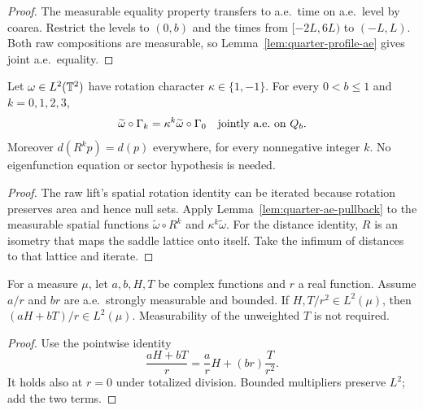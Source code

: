 \begin{proof}
\leanok
The measurable equality property transfers to a.e.\ time on a.e.\
level by coarea. Restrict the levels to $(0,b)$ and the times from
$[-2L,6L)$ to $(-L,L)$. Both raw compositions are measurable, so
Lemma~\ref{lem:quarter-profile-ae} gives joint a.e.\ equality.
\end{proof}

\begin{lemma}
\label{lem:quarter-rotation-character}
\leanok
Let $\omega\in L^2(\mathbb{T}^2)$ have rotation character $\kappa\in\{1,-1\}$.
For every $0<b\le1$ and $k=0,1,2,3$,
\[
 \widetilde\omega\circ\Gamma_k
   =\kappa^k\widetilde\omega\circ\Gamma_0
 \quad\hbox{jointly a.e.\ on }Q_b.
\]
Moreover $d(R^kp)=d(p)$ everywhere, for every nonnegative integer $k$.
No eigenfunction equation or sector hypothesis is needed.
\end{lemma}

\begin{proof}
\leanok
The raw lift's spatial rotation identity can be iterated because
rotation preserves area and hence null sets.
Apply Lemma~\ref{lem:quarter-ae-pullback} to the measurable spatial
functions $\widetilde\omega\circ R^k$ and $\kappa^k\widetilde\omega$.
For the distance identity, $R$ is an isometry that maps the saddle
lattice onto itself. Take the infimum of distances to that lattice
and iterate.
\end{proof}

\begin{lemma}
\label{lem:weighted-frame}
\leanok
For a measure $\mu$, let $a,b,H,T$ be complex functions and $r$ a real
function. Assume $a/r$ and $br$ are a.e.\ strongly measurable and bounded.
If $H,T/r^2\in L^2(\mu)$, then $(aH+bT)/r\in L^2(\mu)$.
Measurability of the unweighted $T$ is not required.
\end{lemma}

\begin{proof}
\leanok
Use the pointwise identity
\[
 \frac{aH+bT}{r}=\frac ar H+(br)\frac{T}{r^2}.
\]
It holds also at $r=0$ under totalized division.
Bounded multipliers preserve $L^2$; add the two terms.
\end{proof}


